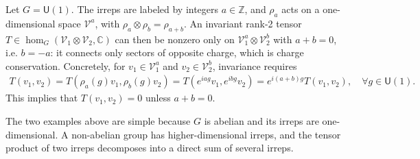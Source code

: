 \begin{example}
Let $G=\mathsf{U}(1)$. The irreps are labeled by integers $a\in\mathbb{Z}$, and $\rho_a$ acts on a one-dimensional space $\mathscr{V}^a$, with $\rho_a\otimes \rho_b = \rho_{a+b}$. An invariant rank-2 tensor $T\in \hom_G(\mathscr{V}_1\otimes \mathscr{V}_2,\mathbb{C})$ can then be nonzero only on $\mathscr{V}_1^a\otimes \mathscr{V}_2^b$ with $a+b=0$, i.e. $b=-a$: it connects only sectors of opposite charge, which is charge conservation. Concretely, for $v_1\in \mathscr{V}_1^{a}$ and $v_2\in \mathscr{V}_2^{b}$, invariance requires
\begin{align}
    T(v_1,v_2) = T(\rho_a(g)v_1,\rho_b(g)v_2) = T(e^{iag}v_1,e^{ibg}v_2) = e^{i(a+b)g}T(v_1,v_2),\quad \forall g\in \mathsf{U}(1).
\end{align}
This implies that $T(v_1,v_2)=0$ unless $a+b=0$.
\end{example}


The two examples above are simple because $G$ is abelian and its irreps are one-dimensional. A non-abelian group has higher-dimensional irreps, and the tensor product of two irreps decomposes into a direct sum of several irreps. 

